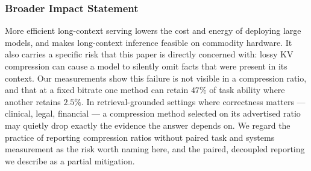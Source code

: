 \documentclass{article}
\theoremstyle{definition}
\begin{document}
\subsubsection*{Broader Impact Statement}

More efficient long-context serving lowers the cost and energy of deploying large models, and makes long-context inference feasible on commodity hardware. It also carries a specific risk that this paper is directly concerned with: lossy KV compression can cause a model to silently omit facts that were present in its context. Our measurements show this failure is not visible in a compression ratio, and that at a fixed bitrate one method can retain $47\%$ of task ability where another retains $2.5\%$. In retrieval-grounded settings where correctness matters --- clinical, legal, financial --- a compression method selected on its advertised ratio may quietly drop exactly the evidence the answer depends on. We regard the practice of reporting compression ratios without paired task and systems measurement as the risk worth naming here, and the paired, decoupled reporting we describe as a partial mitigation.
\end{document}
